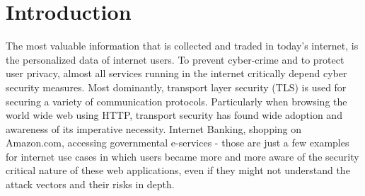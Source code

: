 \section{Introduction}
The most valuable information that is collected and traded in today's internet, is the personalized data of internet users. To prevent cyber-crime and to protect user privacy, almost all services running in the internet critically depend cyber security measures. Most dominantly, transport layer security (TLS) is used for securing a variety of communication protocols. Particularly when browsing the world wide web using HTTP, transport security has found wide adoption and awareness of its imperative necessity. Internet Banking, shopping on Amazon.com, accessing governmental e-services - those are just a few examples for internet use cases in which users became more and more aware of the security critical nature of these web applications, even if they might not understand the attack vectors and their risks in depth. 

